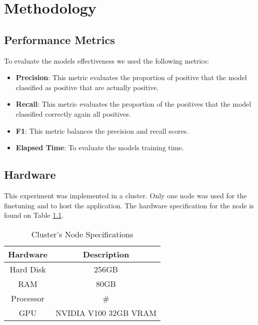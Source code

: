 
\chapter{Methodology}  

\section{Performance Metrics}
To evaluate the models effectiveness we used the following metrics:

\begin{itemize}
	\item{\textbf{Precision}}: This metric evaluates the proportion of positive that the model classified as positive that are actually positive.
	\item{\textbf{Recall}}: This metric evaluates the proportion of the positives that the model classified correctly again all positives.
	\item{\textbf{F1}}: This metric balances the precision and recall scores.
	\item{\textbf{Elapsed Time}}: To evaluate the models training time.
	
\end{itemize}


\section{Hardware}
This experiment was implemented in a cluster. Only one node was used for the finetuning and to host the application. The hardware specification
for the node is found on Table \ref{table:hardware}.

\begin{table}[ht!]
\centering
\caption{Cluster's Node Specifications}
\begin{tabular}{||c | c||} 
 \hline
\textbf{Hardware} & \textbf{Description} \\ [0.5ex] 
 \hline
 Hard Disk & 256GB  \\ 
 \hline
 RAM & 80GB  \\
 \hline
 Processor & \# \\
 \hline
 GPU & NVIDIA V100 32GB VRAM \\
 \hline
\end{tabular}
\label{table:hardware}
\end{table}


